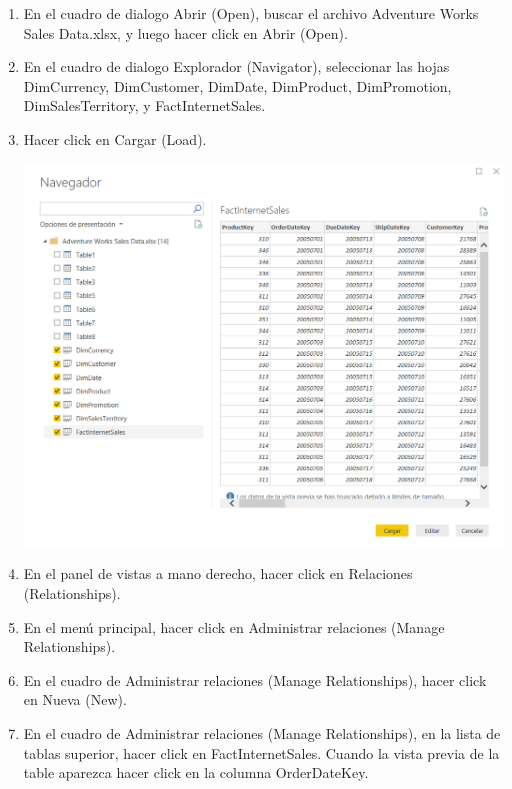 \begin{enumerate}[1.]
    \item  En el cuadro de dialogo Abrir (Open), buscar el archivo Adventure Works Sales Data.xlsx, y luego hacer
click en Abrir (Open).

    \item En el cuadro de dialogo Explorador (Navigator), seleccionar las hojas DimCurrency, DimCustomer,
DimDate, DimProduct, DimPromotion, DimSalesTerritory, y FactInternetSales.
    \item Hacer click en Cargar (Load).

	\begin{center}
	\includegraphics[width=13cm]{./Imagenes/power2}
	\end{center}

    \item En el panel de vistas a mano derecho, hacer click en Relaciones (Relationships).

    \item En el menú principal, hacer click en Administrar relaciones (Manage Relationships).

    \item En el cuadro de Administrar relaciones (Manage Relationships), hacer click en Nueva (New).

    \item  En el cuadro de Administrar relaciones (Manage Relationships), en la lista de tablas superior, hacer click en FactInternetSales. Cuando la vista previa de la table aparezca hacer click en la columna OrderDateKey.


\end{enumerate}
